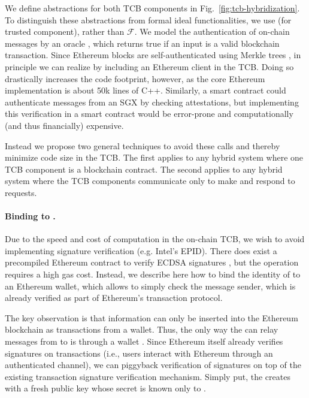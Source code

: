 We define abstractions for both TCB components in Fig.~\ref{fig:tcb-hybridization}.
To distinguish these abstractions from formal ideal functionalities, we use \tcb (for trusted component), rather than $\mathcal{F}$.
We model the authentication of on-chain messages by an oracle \oauth, which returns true if an input is a valid blockchain transaction.
Since Ethereum blocks are self-authenticated using Merkle trees \cite{whitepaper,yellowpaper},
in principle we can realize \oauth by including an Ethereum client in the TCB.
Doing so drastically increases the code footprint, however, as the core Ethereum implementation is about 50k lines of C++.
Similarly, a smart contract could authenticate messages from an SGX by checking attestations,
but implementing this verification in a smart contract would be error-prone and computationally (and thus financially) expensive.

Instead we propose two general techniques to avoid these calls and thereby minimize code size in the TCB.
The first applies to any hybrid system where one TCB component is a blockchain contract.
The second applies to any hybrid system where the TCB components communicate only to make and respond to requests.


\paragraph{Binding \tcboff to \tcadd.}
Due to the speed and cost of computation in the on-chain TCB, we wish to avoid implementing signature verification (e.g. Intel's EPID).
There does exist a precompiled Ethereum contract to verify ECDSA signatures \cite{yellowpaper}, but the operation requires a high gas cost.
Instead, we describe here how to bind the identity of \tcboff to an Ethereum wallet, which allows \tcbon to simply check the message sender,
which is already verified as part of Ethereum's transaction protocol.

The key observation is that information can only be inserted into the Ethereum blockchain as transactions from a wallet.
Thus, the only way the \medname can relay messages from \tcboff to \tcbon is through a wallet \tcadd.
Since Ethereum itself already verifies signatures on transactions (i.e., users interact with Ethereum through an authenticated channel),
we can piggyback verification of \tcboff signatures on top of the existing transaction signature verification mechanism.
Simply put, the \tcboff creates \tcadd with a fresh public key \pkoff whose secret is known only to \tcboff.

